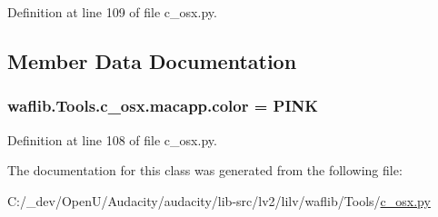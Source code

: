 Definition at line 109 of file c\+\_\+osx.\+py.



\subsection{Member Data Documentation}
\subsubsection[{\texorpdfstring{color}{color}}]{ waflib.\+Tools.\+c\+\_\+osx.\+macapp.\+color = \textquotesingle{}P\+I\+NK\textquotesingle{}\hspace{0.3cm}{\ttfamily [static]}}\hypertarget{classwaflib_1_1_tools_1_1c__osx_1_1macapp_af0b3eade8cf4f9d67946889c4bda83f3}{}\label{classwaflib_1_1_tools_1_1c__osx_1_1macapp_af0b3eade8cf4f9d67946889c4bda83f3}


Definition at line 108 of file c\+\_\+osx.\+py.



The documentation for this class was generated from the following file\+:\begin{DoxyCompactItemize}
\item 
C\+:/\+\_\+dev/\+Open\+U/\+Audacity/audacity/lib-\/src/lv2/lilv/waflib/\+Tools/\hyperlink{lilv_2waflib_2_tools_2c__osx_8py}{c\+\_\+osx.\+py}\end{DoxyCompactItemize}
